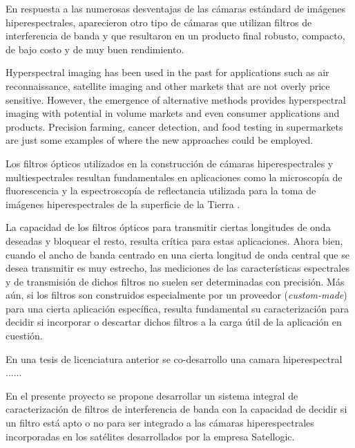 \documentclass{ctuthesis}
\begin{document}
En respuesta a las numerosas desventajas de las cámaras estándard de imágenes 
hiperespectrales, aparecieron otro tipo de cámaras que utilizan filtros de 
interferencia de banda y que resultaron en un producto final robusto, compacto, 
de bajo costo y de muy buen rendimiento.


Hyperspectral imaging has been used in the past for applications such as air 
reconnaissance, satellite imaging and other markets that are not overly price 
sensitive. However, the emergence of alternative methods provides hyperspectral 
imaging with potential in volume markets and even consumer applications and 
products.
Precision farming, cancer detection, and food testing in supermarkets are just 
some examples of where the new approaches could be employed.

\hspace{0.5cm} Los filtros ópticos utilizados en la construcción de cámaras 
hiperespectrales y 
multiespectrales resultan fundamentales en aplicaciones como la microscopía de 
fluorescencia \cite{Grecco2016} y la espectroscopía de reflectancia 
utilizada para la toma de 
imágenes hiperespectrales de la superficie de la Tierra \cite{Hogg2008}.
 
 
 La capacidad de los filtros ópticos para transmitir ciertas longitudes de onda 
deseadas y bloquear el resto, resulta crítica para estas aplicaciones. Ahora 
bien, cuando el ancho de banda centrado en una cierta longitud de onda central 
que se desea transmitir es muy estrecho, las mediciones de las características 
espectrales y de transmisión de dichos filtros no suelen ser determinadas con 
precisión. Más aún, si los filtros son construidos especialmente por un 
proveedor (\textit{custom-made}) para una cierta aplicación específica, resulta 
fundamental su caracterización para decidir si incorporar o descartar dichos 
filtros a la carga útil de la aplicación en cuestión.

En una tesis de licenciatura anterior se co-desarrollo una camara 
hiperespectral ......

En el presente proyecto se propone desarrollar un sistema integral de 
caracterización de filtros de interferencia de banda con la capacidad de 
decidir si un filtro está apto o no para ser integrado a las cámaras 
hiperespectrales incorporadas en los satélites desarrollados por la empresa 
Satellogic.


\end{document}
